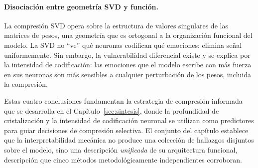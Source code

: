\paragraph{Disociación entre geometría SVD y función.}
La compresión SVD opera sobre la estructura de valores singulares de
las matrices de pesos, una geometría que es ortogonal a la
organización funcional del modelo. La SVD no ``ve'' qué neuronas
codifican qué emociones: elimina señal uniformemente. Sin embargo, la
vulnerabilidad diferencial existe y se explica por la intensidad de
codificación: las emociones que el modelo escribe con más fuerza en
sus neuronas son más sensibles a cualquier perturbación de los pesos,
incluida la compresión.

Estas cuatro conclusiones fundamentan la estrategia de compresión
informada que se desarrolla en el Capítulo~\ref{sec:sintesis}, donde
la profundidad de cristalización y la intensidad de codificación
neuronal se utilizan como predictores para guiar decisiones de
compresión selectiva. El conjunto del capítulo establece que la
interpretabilidad mecánica no produce una colección de hallazgos
disjuntos sobre el modelo, sino una descripción \emph{unificada} de su
arquitectura funcional, descripción que cinco métodos
metodológicamente independientes corroboran.